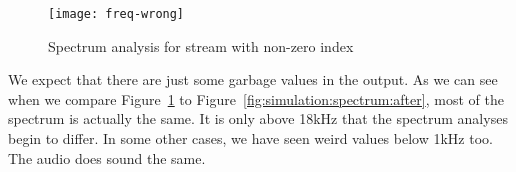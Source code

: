\begin{figure}[H]
	\centering
	\texttt{[image: freq-wrong]}
	\caption{Spectrum analysis for stream with non-zero index}
	\label{fig:simulation:spectrum:wrong}
\end{figure}

We expect that there are just some garbage values in the output.
As we can see when we compare Figure~\ref{fig:simulation:spectrum:wrong} to Figure~\ref{fig:simulation:spectrum:after}, most of the spectrum is actually the same.
It is only above 18kHz that the spectrum analyses begin to differ.
In some other cases, we have seen weird values below 1kHz too.
The audio does sound the same.
